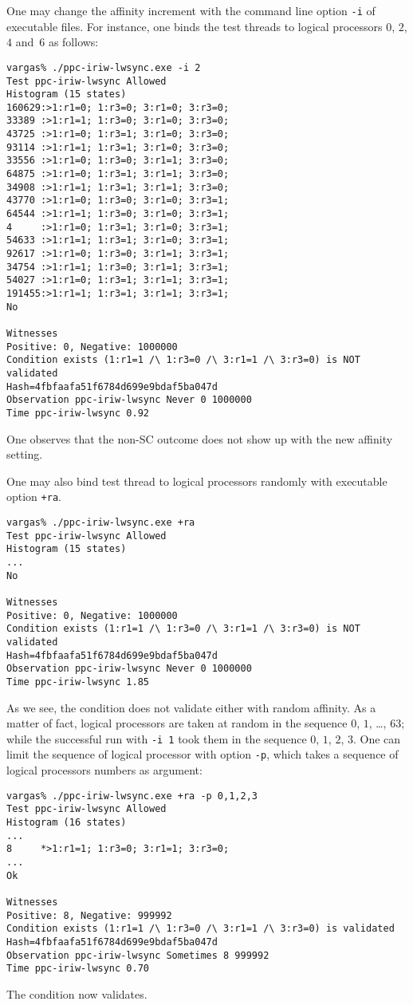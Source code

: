 One may change the affinity increment with the command line option
\texttt{-i} of executable files. For instance, one binds the test threads
to logical processors $0$, $2$, $4$ and~$6$ as follows:
\begin{verbatim}
vargas% ./ppc-iriw-lwsync.exe -i 2
Test ppc-iriw-lwsync Allowed
Histogram (15 states)
160629:>1:r1=0; 1:r3=0; 3:r1=0; 3:r3=0;
33389 :>1:r1=1; 1:r3=0; 3:r1=0; 3:r3=0;
43725 :>1:r1=0; 1:r3=1; 3:r1=0; 3:r3=0;
93114 :>1:r1=1; 1:r3=1; 3:r1=0; 3:r3=0;
33556 :>1:r1=0; 1:r3=0; 3:r1=1; 3:r3=0;
64875 :>1:r1=0; 1:r3=1; 3:r1=1; 3:r3=0;
34908 :>1:r1=1; 1:r3=1; 3:r1=1; 3:r3=0;
43770 :>1:r1=0; 1:r3=0; 3:r1=0; 3:r3=1;
64544 :>1:r1=1; 1:r3=0; 3:r1=0; 3:r3=1;
4     :>1:r1=0; 1:r3=1; 3:r1=0; 3:r3=1;
54633 :>1:r1=1; 1:r3=1; 3:r1=0; 3:r3=1;
92617 :>1:r1=0; 1:r3=0; 3:r1=1; 3:r3=1;
34754 :>1:r1=1; 1:r3=0; 3:r1=1; 3:r3=1;
54027 :>1:r1=0; 1:r3=1; 3:r1=1; 3:r3=1;
191455:>1:r1=1; 1:r3=1; 3:r1=1; 3:r3=1;
No

Witnesses
Positive: 0, Negative: 1000000
Condition exists (1:r1=1 /\ 1:r3=0 /\ 3:r1=1 /\ 3:r3=0) is NOT validated
Hash=4fbfaafa51f6784d699e9bdaf5ba047d
Observation ppc-iriw-lwsync Never 0 1000000
Time ppc-iriw-lwsync 0.92
\end{verbatim}
One observes that the non-SC outcome does not show up
with the new affinity setting.

One may also bind test thread to logical processors randomly with
executable option \texttt{+ra}.
\begin{verbatim}
vargas% ./ppc-iriw-lwsync.exe +ra
Test ppc-iriw-lwsync Allowed
Histogram (15 states)
...
No

Witnesses
Positive: 0, Negative: 1000000
Condition exists (1:r1=1 /\ 1:r3=0 /\ 3:r1=1 /\ 3:r3=0) is NOT validated
Hash=4fbfaafa51f6784d699e9bdaf5ba047d
Observation ppc-iriw-lwsync Never 0 1000000
Time ppc-iriw-lwsync 1.85
\end{verbatim}

As we see, the condition does not validate either with random affinity.
As a matter of fact, logical processors are taken at random in the
sequence $0$, $1$, \ldots, $63$;
while the successful run with \texttt{-i 1} took
them in the sequence $0$, $1$, $2$, $3$.
One can limit the sequence of  logical processor with option \texttt{-p},
which takes a sequence of logical processors numbers as argument:
\begin{verbatim}
vargas% ./ppc-iriw-lwsync.exe +ra -p 0,1,2,3
Test ppc-iriw-lwsync Allowed
Histogram (16 states)
...
8     *>1:r1=1; 1:r3=0; 3:r1=1; 3:r3=0;
...
Ok

Witnesses
Positive: 8, Negative: 999992
Condition exists (1:r1=1 /\ 1:r3=0 /\ 3:r1=1 /\ 3:r3=0) is validated
Hash=4fbfaafa51f6784d699e9bdaf5ba047d
Observation ppc-iriw-lwsync Sometimes 8 999992
Time ppc-iriw-lwsync 0.70
\end{verbatim}
The condition now validates.

